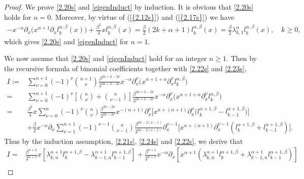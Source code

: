 \documentclass[10pt,reqno]{amsart}
\theoremstyle{remark}
\theoremstyle{definition}
\begin{document}
\begin{proof} We prove \eqref{2.20s} and \eqref{eigenInduct} by induction.
It is obvious that \eqref{2.20s} holds for $n=0$. Moreover, by virtue of {{\rm (\ref{{2.12s}})}} and {{\rm (\ref{{2.17s}})}} we have
\begin{align*}
-x^{-\alpha} \partial_{x} \Big(  x^{\alpha+1} \partial_{x}l_k^{\alpha,\beta}(x)\Big)
+\frac{\beta^2}{4}x l_k^{\alpha,\beta}(x)= \frac{\beta}{2} (2k+\alpha+1) l_k^{\alpha,\beta}(x)
=  \frac{\beta}{2} \lambda^{\alpha}_{k,1} l_k^{\alpha,\beta}(x),\quad k\geq 0,
\end{align*}
which gives \eqref{2.20s} and \eqref{eigenInduct} for $n=1$.

We now assume that  \eqref{2.20s} and \eqref{eigenInduct}  hold for an integer $n\ge 1$. Then
by the  recursive formula of  binomial coefficients
together with \eqref{2.22s} and \eqref{2.23s},
\begin{align*}
I:=&\sum_{\nu=0}^{n+1}(-1)^{\nu} \binom{n+1}{\nu}   \frac{\beta^{2n+2-2\nu}}{2^{2n+2-2\nu}}  x^{-\alpha} \partial_x^{\nu}
  \Big( x^{n+1+\alpha} \partial_x^{\nu} l^{\alpha,\beta}_k  \Big)
\\
 =&\sum_{\nu=0}^{n+1}(-1)^{\nu} \left[ \binom{n}{\nu}+ \binom{n}{\nu-1}\right]   \frac{\beta^{2n+2-2\nu}}{2^{2n+2-2\nu}}  x^{-\alpha} \partial_x^{\nu}
  \Big( x^{n+1+\alpha} \partial_x^{\nu} l^{\alpha,\beta}_k \Big)
\\
 =& \frac{\beta^2}{4} x \sum_{\nu=0}^{n}(-1)^{\nu} \binom{n}{\nu}   \frac{\beta^{2n-2\nu}}{2^{2n-2\nu}}   x^{-(\alpha+1)} \partial_x^{\nu}
  \Big[ x^{n+(\alpha+1)} \partial_x^{\nu}\Big(  l^{\alpha+1,\beta}_k -  l^{\alpha+1,\beta}_{k-1} \Big) \Big]
  \\
& +\frac{\beta}{2} x^{-\alpha} \partial_x \sum_{\nu=1}^{n+1}(-1)^{\nu-1} \binom{n}{\nu-1}   \frac{\beta^{2n-2(\nu-1) }}{2^{2n-2(\nu-1)} } \partial_x^{\nu-1}
  \Big[ x^{n+(\alpha+1)} \partial_x^{\nu-1} \left(  l^{\alpha+1,\beta}_k + l^{\alpha+1,\beta}_{k-1} \right)  \Big].
\end{align*}
Thus by the induction assumption, \eqref{2.21s}, \eqref{2.24s} and \eqref{2.22s}, we derive that
\begin{align*}
 I=&    \frac{\beta^{n+2}}{2^{n+2}}  x \left[\lambda^{\alpha+1}_{k,n} l^{\alpha+1,\beta}_{k} - \lambda^{\alpha+1}_{k-1,n} l^{\alpha+1,\beta}_{k-1} \right]
+  \frac{\beta^{n+1}}{2^{n+1}}  x^{-\alpha}\partial_x \left[ x^{\alpha+1}\left( \lambda^{\alpha+1}_{k,n} l^{\alpha+1,\beta}_{k} +  \lambda^{\alpha+1}_{k-1,n} l^{\alpha+1,\beta}_{k-1}\right) \right]
\\

\end{align*}
\end{proof}
\end{document}
